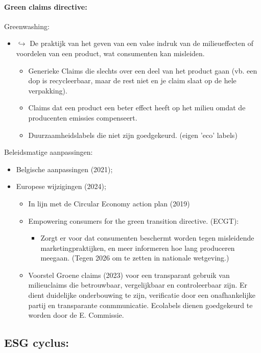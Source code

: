 \documentclass[12pt]{article}
\begin{document}
\paragraph{Green claims directive:}
Greenwashing:\begin{itemize}
    \item $\hookrightarrow$ De praktijk van het geven van een valse indruk van de milieueffecten of voordelen van een product, wat consumenten kan misleiden.\begin{itemize}
        \item Generieke Claims die slechts over een deel van het product gaan (vb. een dop is recycleerbaar, maar de rest niet en je claim slaat op de hele verpakking).
        \item Claims dat een product een beter effect heeft op het milieu omdat de producenten emissies compenseert.
        \item Duurzaamheidslabels die niet zijn goedgekeurd. (eigen 'eco' labels)
    \end{itemize}
\end{itemize}
Beleidsmatige aanpassingen:\begin{itemize}
    \item Belgische aanpassingen (2021);
    \item Europese wijzigingen (2024);\begin{itemize}
        \item In lijn met de Circular Economy action plan (2019)
        \item Empowering consumers for the green transition directive. (ECGT): \begin{itemize}
            \item Zorgt er voor dat consumenten beschermt worden tegen misleidende marketingpraktijken, en meer informeren hoe lang produceren meegaan. (Tegen 2026 om te zetten in nationale wetgeving.)
        \end{itemize}
        \item Voorstel Groene claims (2023) voor een transparant gebruik van milieuclaims die betrouwbaar, vergelijkbaar en controleerbaar zijn. Er dient duidelijke onderbouwing te zijn, verificatie door een onafhankelijke partij en transparante conmmunicatie. Ecolabels dienen goedgekeurd te worden door de E. Commissie.
    \end{itemize}
\end{itemize}
\subsection{ESG cyclus:}
\end{document}
